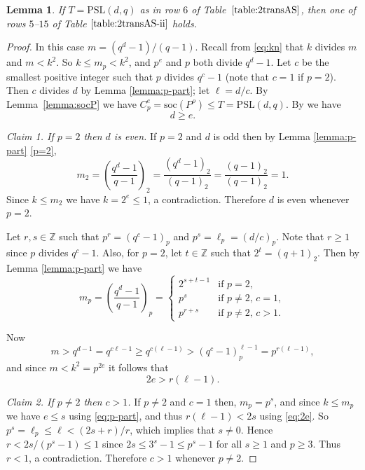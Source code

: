 \documentclass[12pt]{amsart}
\newtheorem{lem}[thm]{Lemma}
\theoremstyle{remark}
\theoremstyle{definition}
\newcommand{\PSL}{\mathrm{PSL}}
\begin{document}
\begin{lem}
\label{lem: 2-trans PSL}
If $T = \PSL(d,q)$ as in row $6$ of Table~$\ref{table:2transAS}$, then one of rows $5$--$15$ of Table $\ref{table:2transAS-ii}$ holds.
\end{lem}
\begin{proof}
In this case $m = (q^d - 1)/(q-1)$. Recall from \eqref{eq:kn} that $k$ divides $m$ and $m < k^2$. So $k \leqslant m_p < k^2$, and $p^e$ and $p$ both divide $q^d - 1$. Let $c$ be the smallest positive integer such that $p$ divides $q^c - 1$ (note that $c = 1$ if $p = 2$). Then $c$ divides $d$ by Lemma \ref{lemma:p-part}; let $\ell = d/c$. By Lemma~\ref{lemma:socP} we have $C^e_p = \mathrm{soc}(P^\rho) \leqslant T = \PSL(d,q)$. By \cite[Lemma 5.5.2]{KL} we have 
	\begin{equation} \label{eq:l>e}
	d \geqslant e.
	\end{equation}


\emph{Claim 1. If $p = 2$ then $d$ is even.} If $p = 2$ and $d$ is odd then by Lemma \ref{lemma:p-part} \eqref{p=2},
	\[ m_2 = \left(\frac{q^d-1}{q-1}\right)_2 = \frac{(q^d-1)_2}{(q-1)_2} = \frac{(q-1)_2}{(q-1)_2} = 1. \]
Since $k \leqslant m_2$ we have $k = 2^e \leqslant 1$, a contradiction. Therefore $d$ is even whenever $p = 2$.

Let $r, s \in \mathbb{Z}$ such that $p^r = (q^c-1)_p$ and $p^s = \ell_p = (d/c)_p$. Note that $r \geqslant 1$ since $p$ divides $q^c-1$. Also, for $p = 2$, let $t \in \mathbb{Z}$ such that $2^t = (q+1)_2$. Then by Lemma \ref{lemma:p-part} we have
	\begin{equation} \label{eq:p-part}
	m_p = \left(\frac{q^d-1}{q-1}\right)_p = \begin{cases} 2^{s+t-1} &\text{if $p = 2$}, \\ p^s &\text{if $p \neq 2$, $c = 1$}, \\ p^{r+s} &\text{if $p \neq 2$, $c > 1$.} \end{cases}
	\end{equation}

Now
	\[ m > q^{d-1} = q^{c\ell-1} \geqslant q^{c(\ell-1)} > (q^c-1)^{\ell-1}_p = p^{r(\ell-1)}, \]
and since $m < k^2 = p^{2e}$ it follows that
	\begin{equation} \label{eq:2e}
	2e > r(\ell-1).
	\end{equation}

\emph{Claim 2. If $p \neq 2$ then $c > 1$.} If $p \neq 2$ and $c = 1$ then, $m_p = p^s$, and since $k \leqslant m_p$ we have $e \leqslant s$ using \eqref{eq:p-part}, and thus $r(\ell-1) < 2s$ using \eqref{eq:2e}. So $p^s = \ell_p \leqslant \ell < (2s+r)/r$, which implies that $s \neq 0$. Hence 
$r < 2s/(p^s-1) \leqslant 1$ since $2s\leqslant 3^s-1\leqslant p^s-1$ for all $s\geqslant 1$ and $p\geqslant3$. Thus $r < 1$, a contradiction. 
Therefore $c > 1$ whenever $p \neq 2$.


\end{proof}
\end{document}

